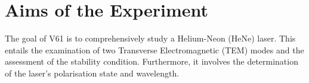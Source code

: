 \section{Aims of the Experiment}
The goal of V61 is to comprehensively study a Helium-Neon (HeNe) laser.
This entails the examination of two Transverse Electromagnetic (TEM) modes 
and the assessment of the stability condition. Furthermore, it involves 
the determination of the laser's polarisation state and wavelength.